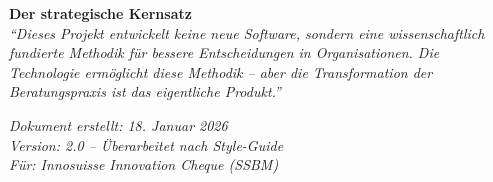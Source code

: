 \documentclass[11pt,a4paper]{article}
\begin{document}
\vspace{1cm}

\begin{center}
\begin{tcolorbox}[colback=lightgray, colframe=innosuisse, width=0.95\textwidth]
\centering
\textbf{Der strategische Kernsatz}\\[0.5em]
\textit{``Dieses Projekt entwickelt keine neue Software, sondern eine wissenschaftlich fundierte Methodik für bessere Entscheidungen in Organisationen. Die Technologie ermöglicht diese Methodik -- aber die Transformation der Beratungspraxis ist das eigentliche Produkt.''}
\end{tcolorbox}
\end{center}

\vspace{2cm}

\begin{flushright}
\textit{Dokument erstellt: 18. Januar 2026}\\
\textit{Version: 2.0 -- Überarbeitet nach Style-Guide}\\
\textit{Für: Innosuisse Innovation Cheque (SSBM)}
\end{flushright}
\end{document}
